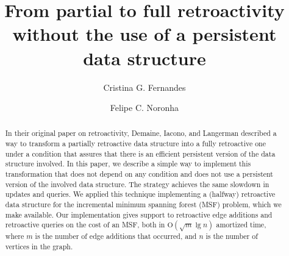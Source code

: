 \documentclass[3p,times,procedia]{elsarticle}
\newcommand{\Oh}{\mathrm{O}}
\begin{document}
\begin{frontmatter}




\title{From partial to full retroactivity without the use of a persistent data structure}


\author{Cristina G. Fernandes}
\author{Felipe C. Noronha}
\address{Department of Computer Science, University of São Paulo, Brazil}

\begin{abstract}
    In their original paper on retroactivity, Demaine, Iacono, and Langerman described 
    a way to transform a partially retroactive data structure into a fully retroactive 
    one under a condition that assures that there is an efficient persistent version 
    of the data structure involved. In this paper, we describe a simple way to implement 
    this transformation that does not depend on any condition and does not use a 
    persistent version of the involved data structure. The strategy achieves the 
    same slowdown in updates and queries. We applied this technique implementing a (halfway) 
    retroactive data structure for the incremental minimum spanning forest (MSF) problem,
    which we make available. Our implementation gives support to retroactive edge additions 
    and retroactive queries on the cost of an MSF, both in $\Oh(\sqrt{m}\lg n)$ amortized time, 
    where $m$ is the number of edge additions that occurred, and $n$ is the number of 
    vertices in the graph.
\end{abstract}


\end{frontmatter}
\end{document}
